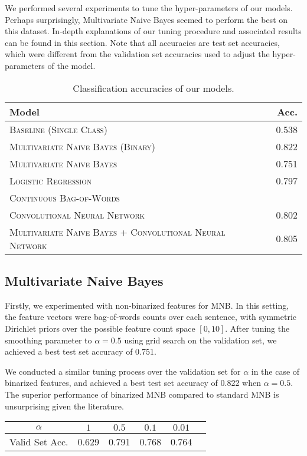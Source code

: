 \documentclass[11pt]{article}
\begin{document}
We performed several experiments to tune the hyper-parameters of our models.  Perhaps surprisingly, Multivariate Naive Bayes seemed to perform the best on this dataset.  In-depth explanations of our tuning procedure and associated results can be found in this section.  Note that all accuracies are test set accuracies, which were different from the validation set accuracies used to adjust the hyper-parameters of the model.  

\begin{table}[H]
\centering
\begin{tabular}{llr}
 \toprule
 Model &  & Acc. \\
 \midrule
 \textsc{Baseline (Single Class)} & & 0.538\\
 \textsc{Multivariate Naive Bayes (Binary)} & & 0.822 \\
 \textsc{Multivariate Naive Bayes} & & 0.751 \\
 \textsc{Logistic Regression} & & 0.797 \\
 \textsc{Continuous Bag-of-Words} & & \\
 \textsc{Convolutional Neural Network} & & 0.802 \\
 \textsc{Multivariate Naive Bayes + Convolutional Neural Network}  & & 0.805 \\
 \bottomrule 
\end{tabular}
\caption{\label{tab:results} Classification accuracies of our models.}
\end{table}

\subsection{Multivariate Naive Bayes} 
Firstly, we experimented with non-binarized features for MNB. In this setting, the feature vectors were bag-of-words counts over each sentence, with symmetric Dirichlet priors over the possible feature count space $[0, 10]$. After tuning the smoothing parameter to $\alpha = 0.5$ using grid search on the validation set, we achieved a best test set accuracy of 0.751. 

We conducted a similar tuning process over the validation set for $\alpha$ in the case of binarized features, and achieved a best test set accuracy of 0.822 when $\alpha = 0.5$. The superior performance of binarized MNB compared to standard MNB is unsurprising given the literature.

\begin{center}
	\begin{tabular}{ c | c c c c c}
		$\alpha$ & $1$ & $0.5$ & $0.1$ & $0.01$ \\
		\hline
		Valid Set Acc. & 0.629 & 0.791 & 0.768 & 0.764 
	\end{tabular}
\end{center}
\end{document}
